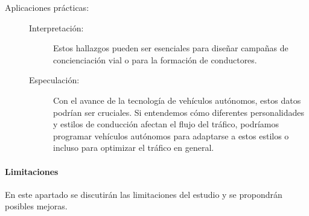 \begin{description}
    \item[Aplicaciones prácticas:] \phantom{-}
    \begin{description}
        \item[Interpretación:] Estos hallazgos pueden ser esenciales para diseñar campañas de concienciación vial o para la formación de conductores.
        \item[Especulación:] Con el avance de la tecnología de vehículos autónomos, estos datos podrían ser cruciales. Si entendemos cómo diferentes personalidades y
        estilos de conducción afectan el flujo del tráfico, podríamos programar vehículos autónomos para adaptarse a estos estilos o incluso para optimizar el tráfico en general.
    \end{description}
\end{description}

\paragraph{Limitaciones}

En este apartado se discutirán las limitaciones del estudio y se propondrán posibles mejoras.

